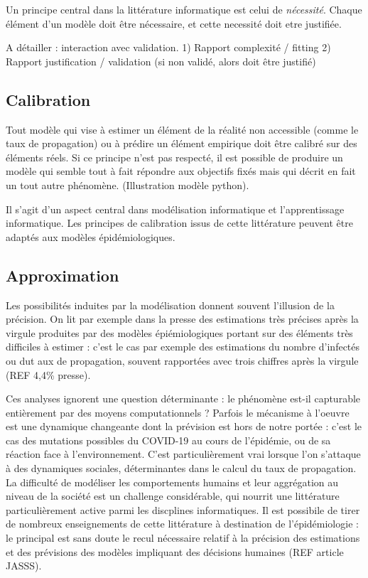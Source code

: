 \documentclass[review]{elsarticle}
\begin{document}
Un principe central dans la littérature informatique est celui de \textit{nécessité}. Chaque élément d'un modèle doit être nécessaire, et cette necessité doit etre justifiée.

A détailler : interaction avec validation. 
1) Rapport complexité / fitting
2) Rapport justification / validation  (si non validé, alors doit être justifié)

\subsection{Calibration}

Tout modèle qui vise à estimer un élément de la réalité non accessible (comme le taux de propagation) ou à prédire un élément empirique doit être calibré sur des éléments réels. Si ce principe n'est pas respecté, il est possible de produire un modèle qui semble tout à fait répondre aux objectifs fixés mais qui décrit en fait un tout autre phénomène. (Illustration modèle python).

Il s'agit d'un aspect central dans modélisation informatique et l'apprentissage informatique. Les principes de calibration issus de cette littérature peuvent être adaptés aux modèles épidémiologiques.

\subsection{Approximation}

Les possibilités induites par la modélisation donnent souvent l'illusion de la précision. On lit par exemple dans la presse des estimations très précises après la virgule produites par des modèles épiémiologiques portant sur des éléments très difficiles à estimer : c'est le cas par exemple des estimations du nombre d'infectés ou dut aux de propagation, souvent rapportées avec trois chiffres après la virgule (REF 4,4\% presse). 

Ces analyses ignorent une question déterminante : le phénomène est-il capturable entièrement par des moyens computationnels ? Parfois le mécanisme à l'oeuvre est une dynamique changeante dont la prévision est hors de notre portée : c'est le cas des mutations possibles du COVID-19 au cours de l'épidémie, ou de sa réaction face à l'environnement. C'est particulièrement vrai lorsque l'on s'attaque à des dynamiques sociales, déterminantes dans le calcul du taux de propagation. La difficulté de modéliser les comportements humains et leur aggrégation au niveau de la société est un challenge considérable, qui nourrit une littérature particulièrement active parmi les discplines informatiques. Il est possibile de tirer de nombreux enseignements de cette littérature à destination de l'épidémiologie : le principal est sans doute le recul nécessaire relatif à la précision des estimations et des prévisions des modèles impliquant des décisions humaines (REF article JASSS).
\end{document}
